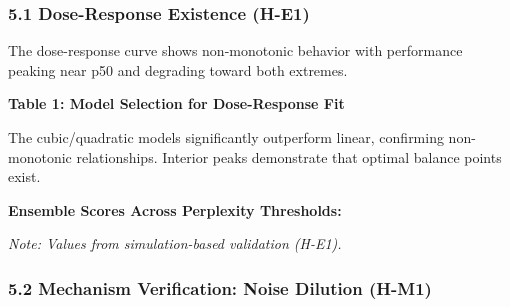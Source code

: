 
\subsubsection{5.1 Dose-Response Existence (H-E1)}

The dose-response curve shows non-monotonic behavior with performance peaking near p50 and degrading toward both extremes.

\textbf{Table 1: Model Selection for Dose-Response Fit}

\begin{table}[htbp]
\centering
{}
\end{table}

The cubic/quadratic models significantly outperform linear, confirming non-monotonic relationships. Interior peaks demonstrate that optimal balance points exist.

\textbf{Ensemble Scores Across Perplexity Thresholds:}

\begin{table}[htbp]
\centering
{}
\end{table}

\textit{Note: Values from simulation-based validation (H-E1).}

\subsubsection{5.2 Mechanism Verification: Noise Dilution (H-M1)}

